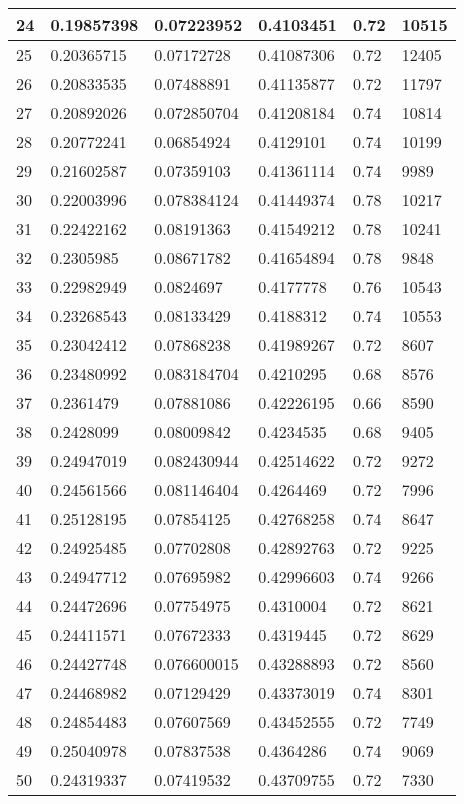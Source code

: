 \begin{longtable}{|l|l|l|l|l|l|}
24 & 0.19857398 & 0.07223952 & 0.4103451 & 0.72 & 10515 \\ \hline 
25 & 0.20365715 & 0.07172728 & 0.41087306 & 0.72 & 12405 \\ \hline 
26 & 0.20833535 & 0.07488891 & 0.41135877 & 0.72 & 11797 \\ \hline 
27 & 0.20892026 & 0.072850704 & 0.41208184 & 0.74 & 10814 \\ \hline 
28 & 0.20772241 & 0.06854924 & 0.4129101 & 0.74 & 10199 \\ \hline 
29 & 0.21602587 & 0.07359103 & 0.41361114 & 0.74 & 9989 \\ \hline 
30 & 0.22003996 & 0.078384124 & 0.41449374 & 0.78 & 10217 \\ \hline 
31 & 0.22422162 & 0.08191363 & 0.41549212 & 0.78 & 10241 \\ \hline 
32 & 0.2305985 & 0.08671782 & 0.41654894 & 0.78 & 9848 \\ \hline 
33 & 0.22982949 & 0.0824697 & 0.4177778 & 0.76 & 10543 \\ \hline 
34 & 0.23268543 & 0.08133429 & 0.4188312 & 0.74 & 10553 \\ \hline 
35 & 0.23042412 & 0.07868238 & 0.41989267 & 0.72 & 8607 \\ \hline 
36 & 0.23480992 & 0.083184704 & 0.4210295 & 0.68 & 8576 \\ \hline 
37 & 0.2361479 & 0.07881086 & 0.42226195 & 0.66 & 8590 \\ \hline 
38 & 0.2428099 & 0.08009842 & 0.4234535 & 0.68 & 9405 \\ \hline 
39 & 0.24947019 & 0.082430944 & 0.42514622 & 0.72 & 9272 \\ \hline 
40 & 0.24561566 & 0.081146404 & 0.4264469 & 0.72 & 7996 \\ \hline 
41 & 0.25128195 & 0.07854125 & 0.42768258 & 0.74 & 8647 \\ \hline 
42 & 0.24925485 & 0.07702808 & 0.42892763 & 0.72 & 9225 \\ \hline 
43 & 0.24947712 & 0.07695982 & 0.42996603 & 0.74 & 9266 \\ \hline 
44 & 0.24472696 & 0.07754975 & 0.4310004 & 0.72 & 8621 \\ \hline 
45 & 0.24411571 & 0.07672333 & 0.4319445 & 0.72 & 8629 \\ \hline 
46 & 0.24427748 & 0.076600015 & 0.43288893 & 0.72 & 8560 \\ \hline 
47 & 0.24468982 & 0.07129429 & 0.43373019 & 0.74 & 8301 \\ \hline 
48 & 0.24854483 & 0.07607569 & 0.43452555 & 0.72 & 7749 \\ \hline 
49 & 0.25040978 & 0.07837538 & 0.4364286 & 0.74 & 9069 \\ \hline 
50 & 0.24319337 & 0.07419532 & 0.43709755 & 0.72 & 7330 \\ \hline 
\end{longtable}